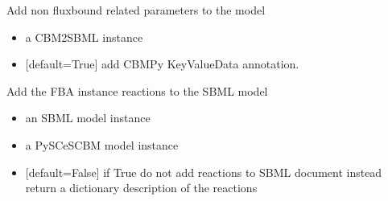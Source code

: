 \documentclass[letterpaper,10pt,english]{sphinxmanual}
\begin{document}
\begin{fulllineitems}
\label{\detokenize{modules_doc:cbmpy.CBXML.sbml_setParametersL3Fbc}}
\pysigstartsignatures
{}
\pysigstopsignatures
\sphinxAtStartPar
Add non fluxbound related parameters to the model
\begin{itemize}
\item {} 
\sphinxAtStartPar
{} a CBM2SBML instance

\item {} 
\sphinxAtStartPar
{} {[}default=True{]} add CBMPy KeyValueData annotation.

\end{itemize}

\end{fulllineitems}


\begin{fulllineitems}
\label{\detokenize{modules_doc:cbmpy.CBXML.sbml_setReactionsL2}}
\pysigstartsignatures
{}
\pysigstopsignatures
\sphinxAtStartPar
Add the FBA instance reactions to the SBML model
\begin{itemize}
\item {} 
\sphinxAtStartPar
{} an SBML model instance

\item {} 
\sphinxAtStartPar
{} a PySCeSCBM model instance

\item {} 
\sphinxAtStartPar
{} {[}default=False{]} if True do not add reactions to SBML document instead return a dictionary description of the reactions

\end{itemize}

\end{fulllineitems}
\end{document}
